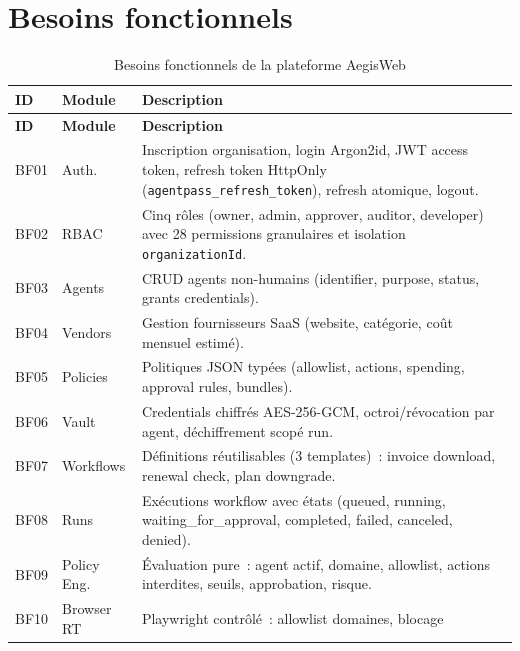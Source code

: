 \section{Besoins fonctionnels}

\begin{longtable}{@{}p{1.2cm}p{2.2cm}p{10.2cm}@{}}
\caption{Besoins fonctionnels de la plateforme AegisWeb}
\label{tab:bf} \\
\toprule
\textbf{ID} & \textbf{Module} & \textbf{Description} \\
\midrule
\endfirsthead
\toprule
\textbf{ID} & \textbf{Module} & \textbf{Description} \\
\midrule
\endhead
\bottomrule
\endfoot
\bottomrule
\endlastfoot
BF01 & Auth.        & Inscription organisation, login Argon2id, JWT access
                      token, refresh token HttpOnly (\texttt{agentpass\_refresh\_token}),
                      refresh atomique, logout. \\
\rowcolor{rowgray}
BF02 & RBAC         & Cinq rôles (owner, admin, approver, auditor, developer)
                      avec 28 permissions granulaires et isolation
                      \texttt{organizationId}. \\
BF03 & Agents       & CRUD agents non-humains (identifier, purpose, status,
                      grants credentials). \\
\rowcolor{rowgray}
BF04 & Vendors      & Gestion fournisseurs SaaS (website, catégorie, coût
                      mensuel estimé). \\
BF05 & Policies     & Politiques JSON typées (allowlist, actions, spending,
                      approval rules, bundles). \\
\rowcolor{rowgray}
BF06 & Vault        & Credentials chiffrés AES-256-GCM, octroi/révocation
                      par agent, déchiffrement scopé run. \\
BF07 & Workflows    & Définitions réutilisables (3 templates)~:
                      invoice download, renewal check, plan downgrade. \\
\rowcolor{rowgray}
BF08 & Runs         & Exécutions workflow avec états (queued, running,
                      waiting\_for\_approval, completed, failed, canceled, denied). \\
BF09 & Policy Eng.  & Évaluation pure~: agent actif, domaine, allowlist,
                      actions interdites, seuils, approbation, risque. \\
\rowcolor{rowgray}
BF10 & Browser RT   & Playwright contrôlé~: allowlist domaines, blocage

\end{longtable}
